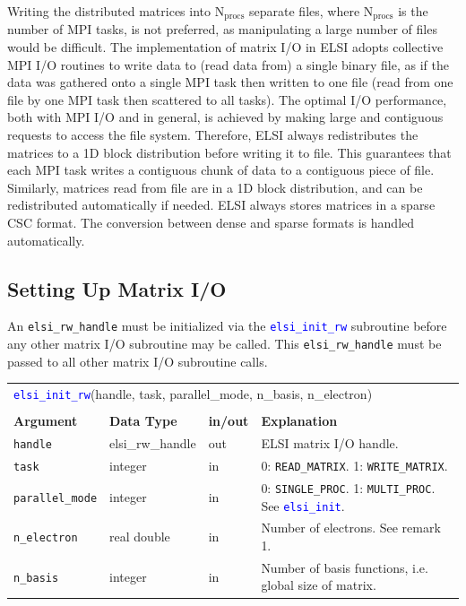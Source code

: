 \documentclass{report}
\newcommand{\api}[1]{\textcolor{blue}{\texttt{#1}}}
\begin{document}
Writing the distributed matrices into $\text{N}_\text{procs}$ separate files, where $\text{N}_\text{procs}$ is the number of MPI tasks, is not preferred, as manipulating a large number of files would be difficult. The implementation of matrix I/O in ELSI adopts collective MPI I/O routines to write data to (read data from) a single binary file, as if the data was gathered onto a single MPI task then written to one file (read from one file by one MPI task then scattered to all tasks). The optimal I/O performance, both with MPI I/O and in general, is achieved by making large and contiguous requests to access the file system. Therefore, ELSI always redistributes the matrices to a 1D block distribution before writing it to file. This guarantees that each MPI task writes a contiguous chunk of data to a contiguous piece of file. Similarly, matrices read from file are in a 1D block distribution, and can be redistributed automatically if needed. ELSI always stores matrices in a sparse CSC format. The conversion between dense and sparse formats is handled automatically.

\subsection{Setting Up Matrix I/O}
\label{subsec:rw_init}
An \texttt{elsi\_rw\_handle} must be initialized via the \api{elsi\_init\_rw} subroutine before any other matrix I/O subroutine may be called. This \texttt{elsi\_rw\_handle} must be passed to all other matrix I/O subroutine calls.

\begin{tabular}[]{|p{25mm}|p{25mm}|p{10mm}|p{102mm}|}
\multicolumn{4}{l}{\api{elsi\_init\_rw}(handle, task, parallel\_mode, n\_basis, n\_electron)}\\
\multicolumn{4}{l}{}\\
\hline
\multicolumn{1}{|l|}{\textbf{Argument}} & \multicolumn{1}{l|}{\textbf{Data Type}} & \multicolumn{1}{l|}{\textbf{in/out}} & \multicolumn{1}{l|}{\textbf{Explanation}}\\
\hline
\texttt{handle}         & elsi\_rw\_handle & out & ELSI matrix I/O handle.\\
\hline
\texttt{task}           & integer          & in  & 0: \texttt{READ\_MATRIX}. 1: \texttt{WRITE\_MATRIX}.\\
\hline
\texttt{parallel\_mode} & integer          & in  & 0: \texttt{SINGLE\_PROC}. 1: \texttt{MULTI\_PROC}. See \api{elsi\_init}.\\
\hline
\texttt{n\_electron}    & real double      & in  & Number of electrons. See remark 1.\\
\hline
\texttt{n\_basis}       & integer          & in  & Number of basis functions, i.e. global size of matrix.\\
\hline
\end{tabular}
\end{document}
